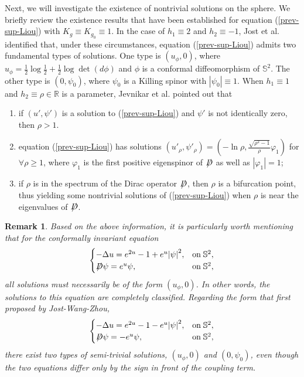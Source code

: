 \documentclass[a4paper, 12pt]{article}
\newtheorem{remark}[theorem]{Remark}
\def\slashiii#1{\setbox0=\hbox{$#1$}#1\hskip-\wd0\hbox to\wd0{\hss\sl/\/\hss}}
\begin{document}
Next, we will investigate the existence of nontrivial solutions on the sphere. We briefly review the existence results that have been established for equation (\ref{prev-sup-Liou}) with $K_g \equiv K_{g_0}\equiv1$. In the case of $h_1\equiv2$ and $h_2\equiv-1$, Jost et al. \cite{jost2007super} identified that, under these circumstances, equation (\ref{prev-sup-Liou}) admits two fundamental types of solutions. One type is \((u_\phi, 0)\), where \(u_\phi = \frac{1}{2}\log \frac{1}{2} + \frac{1}{2}\log \det\left(  {d\phi } \right) \) and $\phi$ is a conformal diffeomorphism of ${\mathbb{S}^2}$.
The other type is \((0, \psi_0)\), where \(\psi_0\) is a Killing spinor with $\left| {{\psi _0}} \right| \equiv1$. When $h_1\equiv1$ and $h_2\equiv \rho\in\mathbb{R}$ is a parameter, Jevnikar et al. \cite{MR4206467} pointed out that
\begin{enumerate}[label=\roman*), leftmargin=*]
	\setcounter{enumi}{0}
	\item if $(u',\psi')$ is a solution to (\ref{prev-sup-Liou}) and $\psi'$ is not identically zero, then $\rho>1$.
	\item equation (\ref{prev-sup-Liou}) has solutions
	$\left( {u'_\rho,\psi'_\rho } \right) = \left( { - \ln \rho ,\frac{{\sqrt {{\rho ^2} - 1} }}{\rho }{\varphi _1}} \right)$
	for $\forall\rho \geq 1$, where $\varphi_1$ is the first positive eigenspinor of $\slashiii{D}$ as well as $\left| {{\varphi _1}} \right| = 1$;
	\item if $\rho$ is in the spectrum of the Dirac operator $\slashiii{D}$, then $\rho$ is a bifurcation point, thus yielding some nontrivial solutions of (\ref{prev-sup-Liou}) when $\rho$ is near the eigenvalues of $\slashiii{D}$.
\end{enumerate}
\begin{remark}
	Based on the above information, it is particularly worth mentioning that for the conformally invariant equation
	\[\begin{cases}
		{ - \Delta u = {e^{2u}} - 1 + {e^u}{{\left| \psi  \right|}^2},}&{{\text{on}}\;{\mathbb{S}^2},} \\
		{\slashiii{D}\psi  = {e^u}\psi ,}&{{\text{on}}\;{\mathbb{S}^2},}
	\end{cases}\]
	all solutions must necessarily be of the form \((u_\phi, 0)\). In other words, the solutions to this equation are completely classified. Regarding the form that first proposed by Jost-Wang-Zhou,
	\[\begin{cases}
		{ - \Delta u = {e^{2u}} - 1 - {e^u}{{\left| \psi  \right|}^2},}&{{\text{on}}\;{\mathbb{S}^2},} \\
		{\slashiii{D}\psi  =  - {e^u}\psi ,}&{{\text{on}}\;{\mathbb{S}^2},}
	\end{cases}\]
	there exist two types of semi-trivial solutions, \((u_\phi, 0)\) and \((0,\psi_0)\), even though the two equations differ only by the sign in front of the coupling term.
\end{remark}
\end{document}
